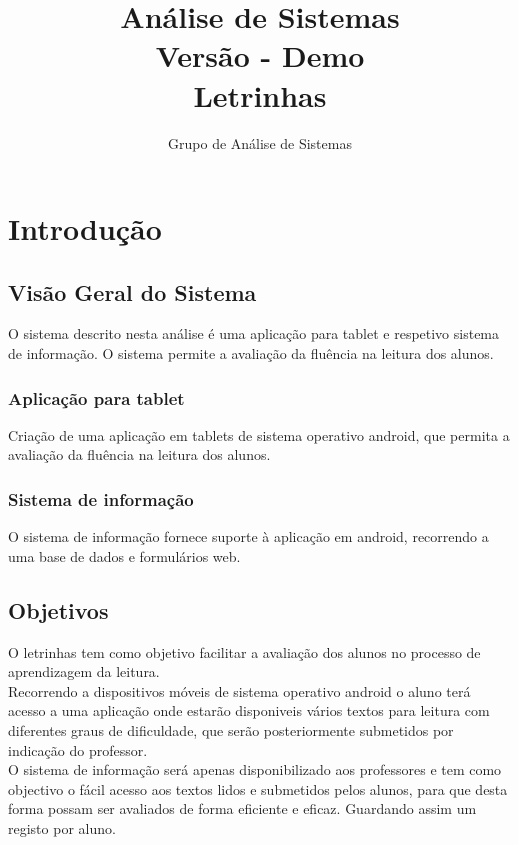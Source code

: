 \documentclass[a4paper,titlepage]{article}
\title{Análise de Sistemas\\ Versão - Demo  \\ Letrinhas}
\author{Grupo de Análise de Sistemas}
\begin{document}
	\maketitle %
	\newpage
	\tableofcontents %
	\newpage %

	 \section{Introdução}%
		\subsection{Visão Geral do Sistema}
		 O sistema descrito nesta análise é uma aplicação para tablet e respetivo sistema de informação. O sistema permite a avaliação da fluência na leitura dos alunos. 
		 	\subsubsection{Aplicação para tablet}
			Criação de uma aplicação em tablets de sistema operativo android, que permita a avaliação da fluência na leitura dos alunos.  
			
			\subsubsection{Sistema de informação}
			O sistema de informação fornece suporte à aplicação em android, recorrendo a uma base de dados e formulários web.
				
		\subsection{Objetivos}
			O letrinhas tem como objetivo facilitar a avaliação dos alunos no processo de aprendizagem da leitura.\\
			
			 Recorrendo a dispositivos móveis de sistema operativo android o aluno terá acesso a uma aplicação onde estarão disponiveis vários textos para leitura com diferentes graus de dificuldade, que serão posteriormente submetidos por indicação do professor.\\
			 
			  O sistema de informação será apenas disponibilizado aos professores e tem como objectivo o fácil acesso aos textos lidos e submetidos pelos alunos, para que desta forma possam ser avaliados de forma eficiente e eficaz. Guardando assim um registo por aluno.
			
\end{document}
